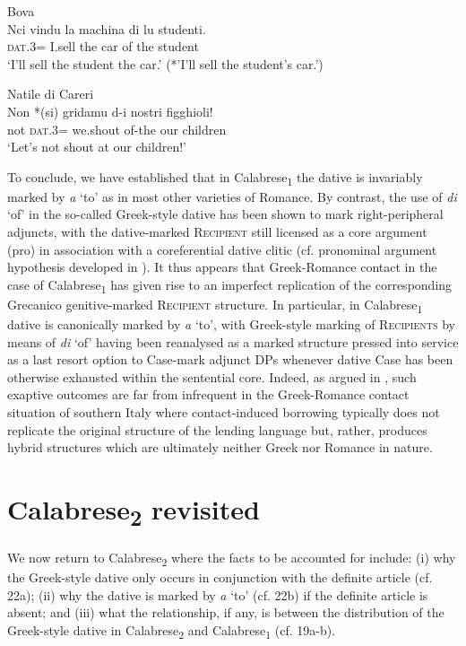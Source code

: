 \documentclass[output=paper,modfonts,nonflat,colorlinks,citecolor=brown]{langsci/langscibook}
\begin{document}
\ea\label{ex:ledgeway:21}
\ea  Bova\\
\gll Nci  vindu  la  machina  di  lu  studenti.\\
    \textsc{dat}.3=  I.sell  the  car  of  the  student\\
    \glt `I’ll sell the student the car.' (*'I’ll sell the student’s car.')

\ex Natile di Careri\\
    \gll Non  *(si)  gridamu  d-i  nostri  figghioli!\\
    not  \textsc{dat}.3=  we.shout  of-the  our  children\\
    \glt `Let’s not shout at our children!'
    \z
    \z

  To conclude, we have established that in Calabrese\textsubscript{1} the dative is invariably marked by \textit{a} ‘to’ as in most other varieties of Romance. By contrast, the use of \textit{di} ‘of’ in the so-called Greek-style dative has been shown to mark right-peripheral adjuncts, with the dative-marked \textsc{Recipient} still licensed as a core argument (pro) in association with a coreferential dative clitic (cf. pronominal argument hypothesis developed in \citealt{Jelinek1984}). It thus appears that Greek-Romance contact in the case of Calabrese\textsubscript{1} has given rise to an imperfect replication of the corresponding Grecanico genitive-marked \textsc{Recipient} structure. In particular, in Calabrese\textsubscript{1} dative is canonically marked by \textit{a} ‘to’, with Greek-style marking of \textsc{Recipients} by means of \textit{di} ‘of’ having been reanalysed as a marked structure pressed into service as a last resort option to Case-mark adjunct DPs whenever dative Case has been otherwise exhausted within the sentential core. Indeed, as argued in \citet{Ledgeway2013}, such exaptive outcomes are far from infrequent in the Greek-Romance contact situation of southern Italy where contact-induced borrowing typically does not replicate the original structure of the lending language but, rather, produces hybrid structures which are ultimately neither Greek nor Romance in nature.

\section{Calabrese\textsubscript{2} revisited}

We now return to Calabrese\textsubscript{2} where the facts to be accounted for include: (i) why the Greek-style dative only occurs in conjunction with the definite article (cf. 22a); (ii) why the dative is marked by \textit{a} ‘to’ (cf. 22b) if the definite article is absent; and (iii) what the relationship, if any, is between the distribution of the Greek-style dative in Calabrese\textsubscript{2} and Calabrese\textsubscript{1} (cf. 19a-b). 
\end{document}
